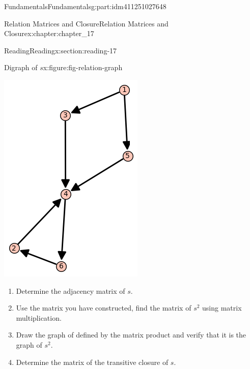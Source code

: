 \documentclass[oneside,10pt,]{book}
\numberwithin{equation}{section}
\begin{document}
\begin{partptx}{Fundamentals}{}{Fundamentals}{}{}{g:part:idm411251027648}
\begin{chapterptx}{Relation Matrices and Closure}{}{Relation Matrices and Closure}{}{}{x:chapter:chapter_17}
\begin{sectionptx}{Reading}{}{Reading}{}{}{x:section:reading-17}
\begin{figureptx}{Digraph of \(s\)}{x:figure:fig-relation-graph}{}%
\begin{image}{0.25}{0.5}{0.25}%
\includegraphics[width=\linewidth]{images/fig-relation-graph.png}
\end{image}%
\tcblower
\end{figureptx}%
%
\begin{enumerate}[label=(\alph*)]
\item{}Determine the adjacency matrix of \(s\).%
\item{}Use the matrix you have constructed, find the matrix of \(s^2\) using matrix multiplication.%
\item{}Draw the graph of defined by the matrix product and verify that it is the graph of \(s^2\).%
\item{}Determine the matrix of the transitive closure of \(s\).%

\end{enumerate}
\end{sectionptx}
\end{chapterptx}
\end{partptx}
\end{document}
